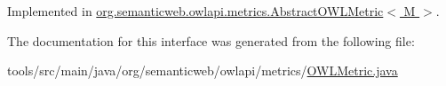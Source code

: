 Implemented in \hyperlink{classorg_1_1semanticweb_1_1owlapi_1_1metrics_1_1_abstract_o_w_l_metric_3_01_m_01_4_ab6f12915419f326fe4f5afc342571854}{org.\-semanticweb.\-owlapi.\-metrics.\-Abstract\-O\-W\-L\-Metric$<$ M $>$}.



The documentation for this interface was generated from the following file\-:\begin{DoxyCompactItemize}
\item 
tools/src/main/java/org/semanticweb/owlapi/metrics/\hyperlink{_o_w_l_metric_8java}{O\-W\-L\-Metric.\-java}\end{DoxyCompactItemize}
